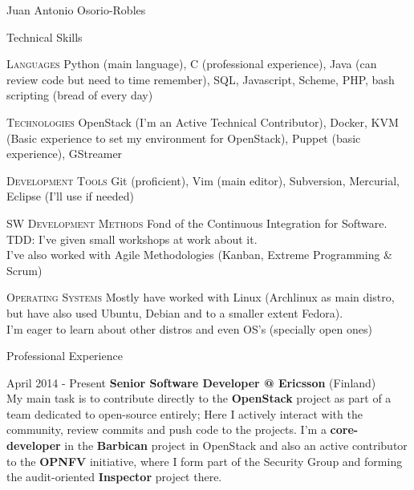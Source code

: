 \documentclass[spanish,10pt,letterpaper]{article}
\begin{document}
\begin{cv}{Juan Antonio Osorio-Robles}
	\begin{cvlist}{Technical Skills}
			\item [\textsc{Languages}]
                Python (main language), C (professional experience), Java
                (can review code but need to time remember), SQL, Javascript,
                Scheme, PHP, bash scripting (bread of every day)
			\item [\textsc{Technologies}]
                OpenStack (I'm an Active Technical Contributor), Docker,
                KVM (Basic experience to set my environment for OpenStack),
                Puppet (basic experience), GStreamer
			\item [\textsc{Development Tools}]
                Git (proficient), Vim (main editor), Subversion, Mercurial,
                Eclipse (I'll use if needed)
			\item [\textsc {SW Development Methods}]
				Fond of the Continuous Integration for Software.\\
                TDD: I've given small workshops at work about it.\\
                I've also worked with Agile Methodologies (Kanban, Extreme
                Programming \& Scrum)
			\item [\textsc {Operating Systems}]
                Mostly have worked with Linux (Archlinux as main distro, but
                have also used Ubuntu, Debian and to a smaller extent
                Fedora).\\
                I'm eager to learn about other distros and even OS's (specially
                open ones)
	\end{cvlist}

	\begin{cvlist}{Professional Experience}
		\item [April 2014 - Present]
            \textbf{Senior Software Developer @ Ericsson} (Finland)\\
            My main task is to contribute directly to the
            \textbf{OpenStack} project as part of a team dedicated to
            open-source entirely; Here I actively interact with the
            community, review commits and push code to the projects. I'm a
            \textbf{core-developer} in the \textbf{Barbican} project in
            OpenStack and also an active contributor to the \textbf{OPNFV}
            initiative, where I form part of the Security Group and forming
            the audit-oriented \textbf{Inspector} project there.\\


\end{cvlist}
\end{cv}
\end{document}
